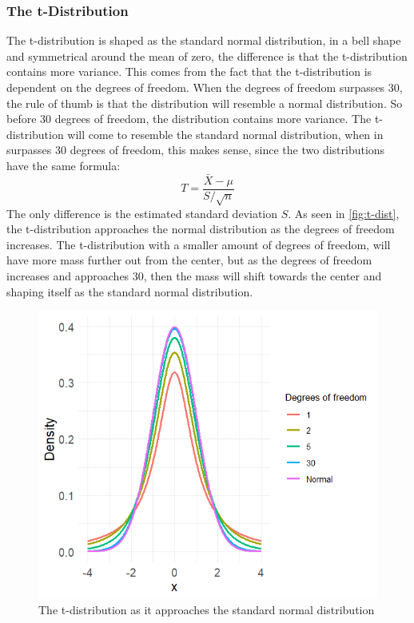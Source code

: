\subsubsection{The t-Distribution}
The t-distribution is shaped as the standard normal distribution, in a bell shape and symmetrical around the mean of zero, the difference is that the t-distribution contains more variance. This comes from the fact that the t-distribution is dependent on the degrees of freedom. When the degrees of freedom surpasses 30, the rule of thumb is that the distribution will resemble a normal distribution. So before 30 degrees of freedom, the distribution contains more variance.
The t-distribution will come to resemble the standard normal distribution, when in surpasses 30 degrees of freedom, this makes sense, since the two distributions have the same formula:
\begin{equation}
	T=\frac{\bar{X}-\mu}{S/\sqrt{n}}
\end{equation}
The only difference is the estimated standard deviation $S$.
As seen in \autoref{fig:t-dist}, the t-distribution approaches the normal distribution as the degrees of freedom increases. The t-distribution with a smaller amount of degrees of freedom, will have more mass further out from the center, but as the degrees of freedom increases and approaches 30, then the mass will shift towards the center and shaping itself as the standard normal distribution.
\begin{figure}[h!]
	\centering
	\begin{minipage}{0.80\textwidth}
		\centering
		\includegraphics[width=\linewidth]{billder/T-distribution.png}
		\caption{The t-distribution as it approaches the standard normal distribution}
		\label{fig:t-dist}
	\end{minipage}\hfill
\end{figure}
